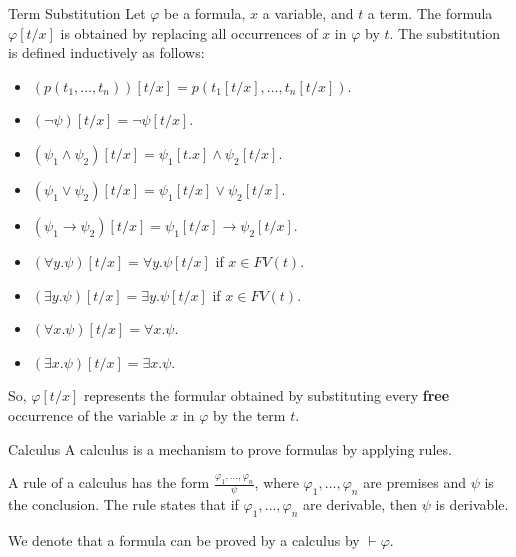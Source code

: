 \documentclass{beamer}
\begin{document}
  \begin{frame}{Term Substitution}
    Let $\varphi$ be a formula, $x$ a variable, and $t$ a term. The formula $\varphi[t/x]$ is obtained by replacing all occurrences of $x$ in $\varphi$ by $t$. The substitution is defined inductively as follows:
    \begin{itemize}
    \item $(p(t_1, \ldots, t_n))[t/x]=p(t_1[t/x], \ldots, t_n[t/x])$.
    \item $(\neg\psi)[t/x]=\neg\psi[t/x]$.
    \item $(\psi_1\wedge\psi_2)[t/x]=\psi_1[t.x]\wedge\psi_2[t/x]$.
    \item $(\psi_1\vee\psi_2)[t/x]=\psi_1[t/x]\vee\psi_2[t/x]$.
    \item $(\psi_1\rightarrow\psi_2)[t/x]=\psi_1[t/x]\rightarrow\psi_2[t/x]$.
    \item   $(\forall y.\psi)[t/x]=\forall y.\psi[t/x]$ if $x\in FV(t)$.
    \item $(\exists y.\psi)[t/x]=\exists y.\psi[t/x]$ if $x\in FV(t)$.
    \item $(\forall x.\psi)[t/x]=\forall x.\psi$.
    \item $(\exists x.\psi)[t/x]=\exists x.\psi$.
    \end{itemize}

    So, $\varphi[t/x]$ represents the formular obtained by substituting every \textbf{free} occurrence of the variable $x$ in $\varphi$ by the term $t$.
  \end{frame}
    
  \begin{frame}{Calculus}
    A calculus is a mechanism to prove formulas by applying rules.

    A rule of a calculus has the form $\frac{\varphi_1, \ldots, \varphi_n}{\psi}$, where $\varphi_1, \ldots, \varphi_n$ are premises and $\psi$ is the conclusion. The rule states that if $\varphi_1, \ldots, \varphi_n$ are derivable, then $\psi$ is derivable.

    We denote that a formula can be proved by a calculus by $\vdash\varphi$.
  \end{frame}



  
  
\end{document}
